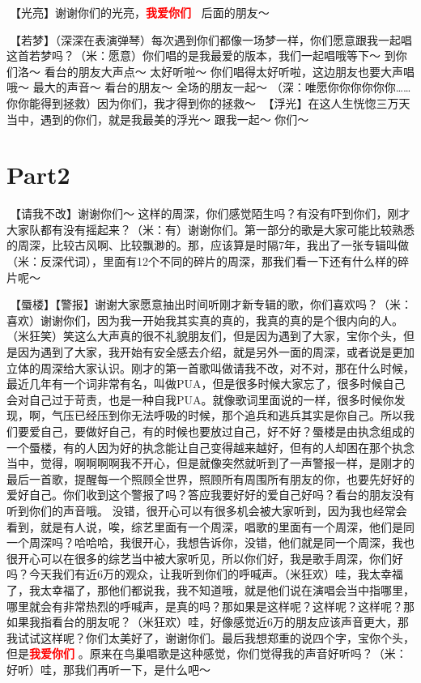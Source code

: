 \documentclass[
]{book}
\begin{document}
🎵【光亮】谢谢你们的光亮，\textbf{\textcolor{red}{我爱你们~} } 后面的朋友～

🎵【若梦】（深深在表演弹琴）每次遇到你们都像一场梦一样，你们愿意跟我一起唱这首若梦吗？（米：愿意）你们唱的是我最爱的版本，我们一起唱哦等下～ 到你们洛～ 看台的朋友大声点～ 太好听啦～ 你们唱得太好听啦，这边朋友也要大声唱哦～ 最大的声音～ 看台的朋友～ 全场的朋友一起～ （深：唯愿你你你你你你\ldots\ldots 你你能得到拯救）因为你们，我才得到你的拯救～
🎵【浮光】在这人生恍惚三万天当中，遇到的你们，就是我最美的浮光～ 跟我一起～ 你们～

\section{Part2}\label{beijing-20240921-part2}

🎵【请我不改】谢谢你们～ 这样的周深，你们感觉陌生吗？有没有吓到你们，刚才大家队都有没有摇起来？（米：有）谢谢你们。第一部分的歌是大家可能比较熟悉的周深，比较古风啊、比较飘渺的。那，应该算是时隔7年，我出了一张专辑叫做（米：反深代词），里面有12个不同的碎片的周深，那我们看一下还有什么样的碎片呢～

🎵【蜃楼】【警报】谢谢大家愿意抽出时间听刚才新专辑的歌，你们喜欢吗？（米：喜欢）谢谢你们，因为我一开始我其实真的真的，我真的真的是个很内向的人。（米狂笑）笑这么大声真的很不礼貌朋友们，但是因为遇到了大家，宝你个头，但是因为遇到了大家，我开始有安全感去介绍，就是另外一面的周深，或者说是更加立体的周深给大家认识。刚才的第一首歌叫做请我不改，对不对，那在什么时候，最近几年有一个词非常有名，叫做PUA，但是很多时候大家忘了，很多时候自己会对自己过于苛责，也是一种自我PUA。就像歌词里面说的一样，很多时候你发现，啊，气压已经压到你无法呼吸的时候，那个追兵和逃兵其实是你自己。所以我们要爱自己，要做好自己，有的时候也要放过自己，好不好？蜃楼是由执念组成的一个蜃楼，有的人因为好的执念能让自己变得越来越好，但有的人却困在那个执念当中，觉得，啊啊啊啊我不开心，但是就像突然就听到了一声警报一样，是刚才的最后一首歌，提醒每一个照顾全世界，照顾所有周围所有朋友的你，也要先好好的爱好自己。你们收到这个警报了吗？答应我要好好的爱自己好吗？看台的朋友没有听到你们的声音哦。
没错，很开心可以有很多机会被大家听到，因为我也经常会看到，就是有人说，唉，综艺里面有一个周深，唱歌的里面有一个周深，他们是同一个周深吗？哈哈哈，我很开心，我想告诉你，没错，他们就是同一个周深，我也很开心可以在很多的综艺当中被大家听见，所以你们好，我是歌手周深，你们好吗？今天我们有近6万的观众，让我听到你们的呼喊声。（米狂欢）哇，我太幸福了，我太幸福了，那他们都说我，我不知道哦，就是他们说在演唱会当中指哪里，哪里就会有非常热烈的呼喊声，是真的吗？那如果是这样呢？这样呢？这样呢？那如果我指看台的朋友呢？（米狂欢）哇，好像感觉近6万的朋友应该声音更大，那我试试这样呢？你们太美好了，谢谢你们。最后我想郑重的说四个字，宝你个头，但是\textbf{\textcolor{red}{我爱你们} }。原来在鸟巢唱歌是这种感觉，你们觉得我的声音好听吗？（米：好听）哇，那我们再听一下，是什么吧～
\end{document}
